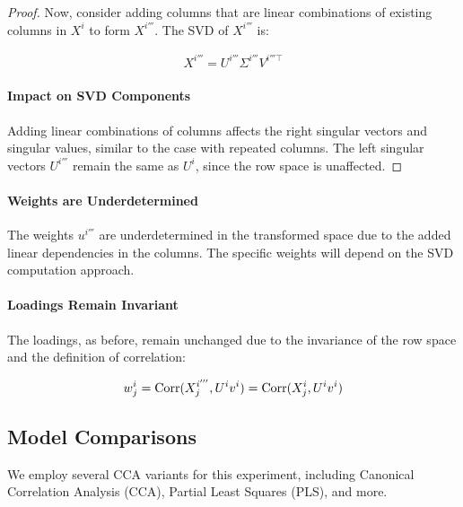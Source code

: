 \begin{proof}
Now, consider adding columns that are linear combinations of existing columns in \( X^{i} \) to form \( X^{i'''} \). The SVD of \( X^{i'''} \) is:

\begin{align}
    X^{i'''} = U^{i'''}\Sigma^{i'''}V^{i'''\top} \label{eq:svd_linear_combinations}
\end{align}

\paragraph{Impact on SVD Components}
Adding linear combinations of columns affects the right singular vectors and singular values, similar to the case with repeated columns. The left singular vectors \( U^{i'''} \) remain the same as \( U^{i} \), since the row space is unaffected.
\end{proof}

\paragraph{Weights are Underdetermined}
The weights \( u^{i'''} \) are underdetermined in the transformed space due to the added linear dependencies in the columns. The specific weights will depend on the SVD computation approach.

\paragraph{Loadings Remain Invariant}
The loadings, as before, remain unchanged due to the invariance of the row space and the definition of correlation:

\begin{align}\label{eq:loading_invariant_linear_combinations}
    w^{i}_j = \operatorname{Corr}(X^{i'''}_j, U^{i}v^{i}) = \operatorname{Corr}(X^{i}_j, U^{i}v^{i})
\end{align}

\subsection{Model Comparisons}
We employ several CCA variants for this experiment, including Canonical Correlation Analysis (CCA), Partial Least Squares (PLS), and more.

